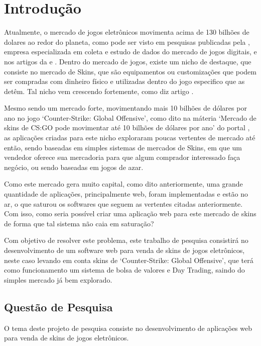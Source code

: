 
\chapter[Introdução]{Introdução}
Atualmente, o mercado de jogos eletrônicos movimenta acima de 130 bilhões de dolares ao redor do planeta, como pode ser visto em pesquisas publicadas pela , empresa especializada em coleta e estudo de dados do mercado de jogos digitais, e nos artigos da  e . Dentro do mercado de jogos, existe um nicho de destaque, que consiste no mercado de Skins, que são equipamentos ou customizações que podem ser compradas com dinheiro físico e utilizadas dentro do jogo especifico que as detêm. Tal nicho vem crescendo fortemente, como diz artigo .

Mesmo sendo um mercado forte, movimentando mais 10 bilhões de dólares por ano no jogo ‘Counter-Strike: Global Offensive’, como dito na máteria ‘Mercado de skins de CS:GO pode movimentar até 10 bilhões de dólares por ano’ do portal , as aplicações criadas para este nicho exploraram poucas vertentes de mercado até então, sendo baseadas em simples sistemas de mercados de Skins, em que um vendedor oferece sua mercadoria para que algum comprador interessado faça negócio, ou sendo baseadas em jogos de azar.

Como este mercado gera muito capital, como dito anteriormente, uma grande quantidade de aplicações, principalmente web, foram implementadas e estão no ar, o que saturou os softwares que seguem as vertentes citadas anteriormente. Com isso, como seria possível criar uma aplicação web para este mercado de skins de forma que tal sistema não caia em saturação?

Com objetivo de resolver este problema, este trabalho de pesquisa consistirá no desenvolvimento de um software web para venda de skins de jogos eletrônicos, neste caso levando em conta skins de ‘Counter-Strike: Global Offensive’, que terá como funcionamento um sistema de bolsa de valores e Day Trading, saindo do simples mercado já bem explorado.

\section{Questão de Pesquisa}
O tema deste projeto de pesquisa consiste no desenvolvimento de aplicações web para venda de skins de jogos eletrônicos.

